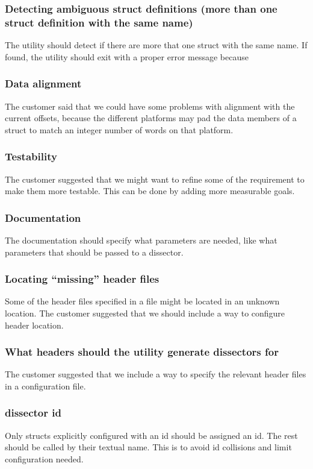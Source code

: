 \subsubsection{Detecting ambiguous \gls{struct} definitions (more than one \gls{struct} definition with the same name)}
The \gls{utility} should detect if there are more that one \gls{struct} with the same name. If found, the \gls{utility} should exit with a proper error message because 

\subsubsection{Data alignment}
The customer said that we could have some problems with alignment with the current offsets, because the different platforms may pad the data \glspl{member} of a \gls{struct} to match an \gls{integer} number of words on that platform.

\subsubsection{Testability}
The customer suggested that we might want to refine some of the requirement to make them more testable. This can be done by adding more measurable goals.

\subsubsection{Documentation}
The documentation should specify what parameters are needed, like what parameters that should be passed to a \gls{dissector}.

\subsubsection{Locating “missing” \gls{header} files}
Some of the \gls{header} files specified in a file might be located in an unknown location. The customer suggested that we should include a way to configure \gls{header} location.

\subsubsection{What \glspl{header} should the \gls{utility} generate \glspl{dissector} for}
The customer suggested that we include a way to specify the relevant \gls{header} files in a configuration file.

\subsubsection{\Gls{dissector} id}
Only \glspl{struct} explicitly configured with an id should be assigned an id. The rest should be called by their textual name. This is to avoid id collisions and limit configuration needed.

